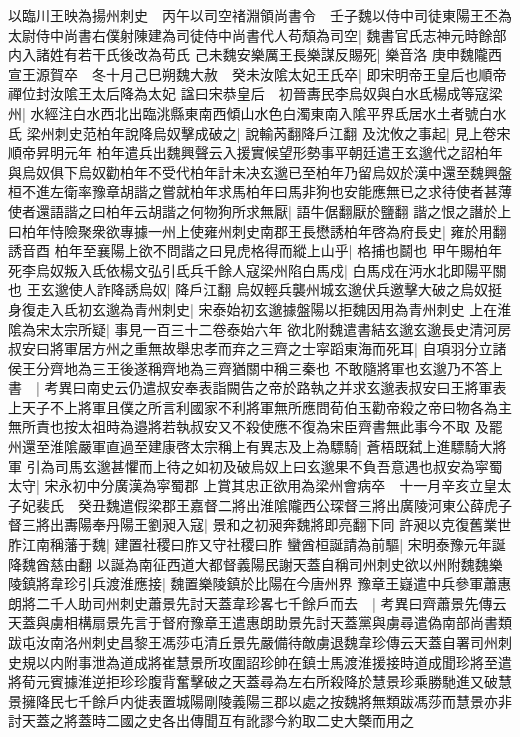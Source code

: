 以臨川王映為揚州刺史　丙午以司空禇淵領尚書令　壬子魏以侍中司徒東陽王丕為太尉侍中尚書右僕射陳建為司徒侍中尚書代人苟頹為司空|{
	魏書官氏志神元時餘部内入諸姓有若干氏後改為苟氏}
己未魏安樂厲王長樂謀反賜死|{
	樂音洛}
庚申魏隴西宣王源賀卒　冬十月己巳朔魏大赦　癸未汝隂太妃王氏卒|{
	即宋明帝王皇后也順帝禪位封汝隂王太后降為太妃}
諡曰宋恭皇后　初晉夀民李烏奴與白水氐楊成等寇梁州|{
	水經注白水西北出臨洮縣東南西傾山水色白濁東南入隂平界氐居水土者號白水氐}
梁州刺史范柏年說降烏奴擊成破之|{
	說輸芮翻降戶江翻}
及沈攸之事起|{
	見上卷宋順帝昇明元年}
柏年遣兵出魏興聲云入援實候望形勢事平朝廷遣王玄邈代之詔柏年與烏奴俱下烏奴勸柏年不受代柏年計未决玄邈已至柏年乃留烏奴於漢中還至魏興盤桓不進左衛率豫章胡諧之嘗就柏年求馬柏年曰馬非狗也安能應無已之求待使者甚薄使者還語諧之曰柏年云胡諧之何物狗所求無厭|{
	語牛倨翻厭於鹽翻}
諧之恨之譖於上曰柏年恃險聚衆欲專據一州上使雍州刺史南郡王長懋誘柏年啓為府長史|{
	雍於用翻誘音酉}
柏年至襄陽上欲不問諧之曰見虎格得而縱上山乎|{
	格捕也鬬也}
甲午賜柏年死李烏奴叛入氐依楊文弘引氐兵千餘人寇梁州陷白馬戍|{
	白馬戍在沔水北即陽平關也}
王玄邈使人詐降誘烏奴|{
	降戶江翻}
烏奴輕兵襲州城玄邈伏兵邀擊大破之烏奴挺身復走入氐初玄邈為青州刺史|{
	宋泰始初玄邈據盤陽以拒魏因用為青州刺史}
上在淮隂為宋太宗所疑|{
	事見一百三十二卷泰始六年}
欲北附魏遣書結玄邈玄邈長史清河房叔安曰將軍居方州之重無故舉忠孝而弃之三齊之士寜蹈東海而死耳|{
	自項羽分立諸侯王分齊地為三王後遂稱齊地為三齊猶關中稱三秦也}
不敢隨將軍也玄邈乃不答上書　|{
	考異曰南史云仍遣叔安奉表詣闕告之帝於路執之并求玄邈表叔安曰王將軍表上天子不上將軍且僕之所言利國家不利將軍無所應問荀伯玉勸帝殺之帝曰物各為主無所責也按太祖時為邉將若執叔安又不殺使應不復為宋臣齊書無此事今不取}
及罷州還至淮隂嚴軍直過至建康啓太宗稱上有異志及上為驃騎|{
	蒼梧既弑上進驃騎大將軍}
引為司馬玄邈甚懼而上待之如初及破烏奴上曰玄邈果不負吾意遇也叔安為寜蜀太守|{
	宋永初中分廣漢為寜蜀郡}
上賞其忠正欲用為梁州會病卒　十一月辛亥立皇太子妃裴氏　癸丑魏遣假梁郡王嘉督二將出淮隂隴西公琛督三將出廣陵河東公薛虎子督三將出夀陽奉丹陽王劉昶入寇|{
	景和之初昶奔魏將即亮翻下同}
許昶以克復舊業世胙江南稱藩于魏|{
	建置社稷曰胙又守社稷曰胙}
蠻酋桓誕請為前驅|{
	宋明泰豫元年誕降魏酋慈由翻}
以誕為南征西道大都督義陽民謝天蓋自稱司州刺史欲以州附魏魏樂陵鎮將韋珍引兵渡淮應接|{
	魏置樂陵鎮於比陽在今唐州界}
豫章王嶷遣中兵參軍蕭惠朗將二千人助司州刺史蕭景先討天蓋韋珍畧七千餘戶而去　|{
	考異曰齊蕭景先傳云天蓋與虜相構扇景先言于督府豫章王遣惠朗助景先討天蓋黨與虜尋遣偽南部尚書類跋屯汝南洛州刺史昌黎王馮莎屯清丘景先嚴備待敵虜退魏韋珍傳云天蓋自署司州刺史規以内附事泄為道成將崔慧景所攻圍詔珍帥在鎮士馬渡淮援接時道成聞珍將至遣將荀元賓據淮逆拒珍珍腹背奮擊破之天蓋尋為左右所殺降於慧景珍乘勝馳進又破慧景擁降民七千餘戶内徙表置城陽剛陵義陽三郡以處之按魏將無類跋馮莎而慧景亦非討天蓋之將蓋時二國之史各出傳聞互有訛謬今約取二史大槩而用之}
